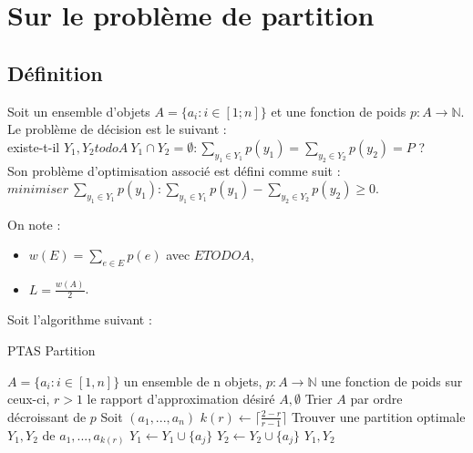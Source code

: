 
\section{Sur le problème de partition}\label{ex5}

\subsection{D\'efinition}\label{ex5_def}
Soit un ensemble d'objets $A = \{a_i : i \in [1;n]\}$ et une fonction de poids $p : A
\rightarrow \mathbb{N}$.\\
Le problème de décision est le suivant : \\
existe-t-il $Y_1,Y_2 todo A\ Y_1 \cap Y_2 = \emptyset: \sum_{y_{1} \in Y_1}p(y_1) = \sum_{y_2 
\in Y_2}p(y_2) = P$ ?\\
Son problème d'optimisation associé est défini comme suit :\\
$minimiser\ \sum_{y_1 \in Y_1}p(y_1) : \sum_{y_1 \in Y_1}p(y_1) - \sum_{y_2 \in Y_2}p(y_2) 
\geq 0$.

On note :
\begin{itemize}
	\item $w(E) = \sum_{e \in E}p(e)$ avec $E TODO A$,
	\item $L = \frac{w(A)}{2}$.
\end{itemize}

Soit l'algorithme suivant :

\begin{center}
\begin{algorithm}[H]
\caption{PTAS Partition}\label{ex5_algo}
\begin{algorithmic}[1]
\REQUIRE $A = \{a_i : i \in [1,n]\}$ un ensemble de n objets,
		 $p : A \rightarrow \mathbb{N}$ une fonction de poids sur ceux-ci,
		 $r > 1$ le rapport d'approximation désiré
		\RETURN $A,\emptyset$
	\ENDIF
	\STATE Trier $A$ par ordre décroissant de $p$
	\STATE Soit $(a_1,...,a_n)$
	\STATE $k(r) \leftarrow \lceil\frac{2-r}{r-1}\rceil$
	\STATE Trouver une partition optimale $Y_1,Y_2$ de $a_1,...,a_{k(r)}$
			\STATE $Y_1 \leftarrow Y_1 \cup \{a_j\}$
		\ELSE
			\STATE $Y_2 \leftarrow Y_2 \cup \{a_j\}$
		\ENDIF
	\ENDFOR
	\RETURN $Y_1,Y_2$
\end{algorithmic}
\end{algorithm}
\end{center}

